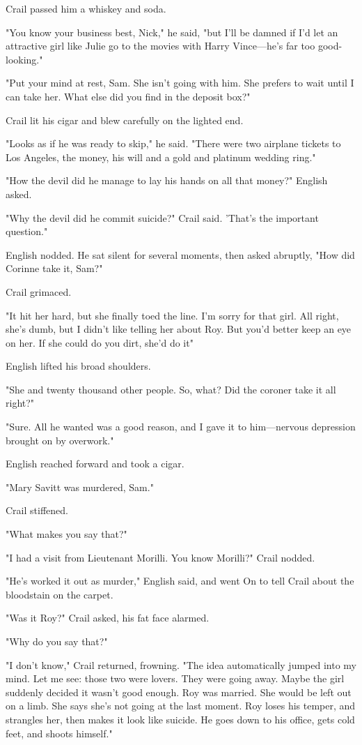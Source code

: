 \documentclass{novel}
\begin{document}
Crail passed him a whiskey and soda.

"You know your business best, Nick," he said, "but I'll be damned if I'd let an attractive girl like Julie go to the movies with Harry Vince—he's far too good-looking."

"Put your mind at rest, Sam. She isn't going with him. She prefers to wait until I can take her. What else did you find  in  the  deposit  box?"

Crail lit his cigar and blew carefully on the lighted end.

"Looks as if he was ready to skip," he said. "There were two airplane tickets to Los Angeles, the money, his will and a gold and platinum wedding ring."

"How the devil did he manage to lay his hands on all that money?" English asked.

"Why the devil did he commit suicide?" Crail said. 'That's the important question."

English nodded. He sat silent for several moments, then asked abruptly, "How did Corinne take it, Sam?"

Crail grimaced.

"It hit her hard, but she finally toed the line. I'm sorry for that girl. All right, she's dumb, but I didn't like telling her about Roy. But you'd better keep an eye on her. If she could do you dirt, she'd do it"

English lifted his broad shoulders.

"She and twenty thousand other people. So, what? Did the coroner take it all right?"

"Sure. All he wanted was a good reason, and I gave it to him—nervous depression brought on by overwork."

English reached forward and took a cigar.

"Mary Savitt was murdered, Sam."

Crail stiffened.

"What makes you say that?"

"I had a visit from Lieutenant Morilli. You know Morilli?" Crail nodded.

"He's worked it out as murder," English said, and went On to tell Crail about the bloodstain on the carpet.

"Was it Roy?" Crail asked, his fat face alarmed.

"Why do you say that?"

"I don't know," Crail returned, frowning. "The idea automatically jumped into my mind. Let me see: those two were lovers. They were going away. Maybe the girl suddenly decided it wasn't good enough. Roy was married. She would be left out on a limb. She says she's not going at the last moment. Roy loses his temper, and strangles her, then makes it look like suicide. He goes down to his office, gets cold feet, and shoots himself."
\end{document}
